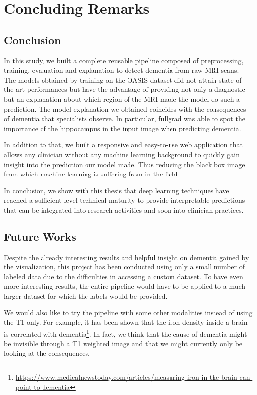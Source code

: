 \chapter{Concluding Remarks}
\label{chap:conculusion}

\section{Conclusion}
In this study, we built a complete reusable pipeline composed of preprocessing, training, evaluation and explanation to detect dementia from raw MRI scans. The models obtained by training on the OASIS dataset did not attain state-of-the-art performances but have the advantage of providing not only a diagnostic but an explanation about which region of the MRI made the model do such a prediction. The model explanation we obtained coincides with the consequences of dementia that specialists observe. In particular, fullgrad was able to spot the importance of the hippocampus in the input image when predicting dementia.

In addition to that, we built a responsive and easy-to-use web application that allows any clinician without any machine learning background to quickly gain insight into the prediction our model made. Thus reducing the black box image from which machine learning is suffering from in the field.  

In conclusion, we show with this thesis that deep learning techniques have reached a sufficient level technical maturity to provide interpretable predictions that can be integrated into research activities and soon into clinician practices.

\section{Future Works}
Despite the already interesting results and helpful insight on dementia gained by the visualization, this project has been conducted using only a small number of labeled data due to the difficulties in accessing a custom dataset. To have even more interesting results, the entire pipeline would have to be applied to a much larger dataset for which the labels would be provided.

We would also like to try the pipeline with some other modalities instead of using the T1 only. For example, it has been shown that the iron density inside a brain is correlated with dementia\footnote{\href{https://www.medicalnewstoday.com/articles/measuring-iron-in-the-brain-can-point-to-dementia}{https://www.medicalnewstoday.com/articles/measuring-iron-in-the-brain-can-point-to-dementia}}. In fact, we think that the cause of dementia might be invisible through a T1 weighted image and that we might currently only be looking at the consequences.


